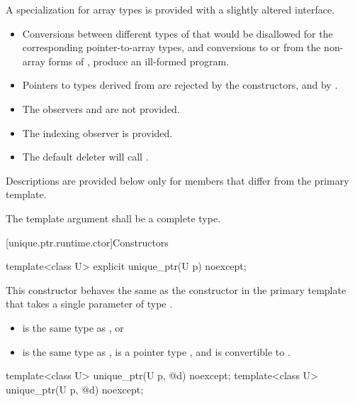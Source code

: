 \pnum
A specialization for array types is provided with a slightly altered
interface.

\begin{itemize}
\item Conversions between different types of
that would be disallowed for the corresponding pointer-to-array types,
and conversions to or from the non-array forms of
, produce an ill-formed program.

\item Pointers to types derived from  are
rejected by the constructors, and by .

\item The observers  and
 are not provided.

\item The indexing observer  is provided.

\item The default deleter will call .
\end{itemize}

\pnum
Descriptions are provided below only for members that
differ from the primary template.

\pnum
The template argument  shall be a complete type.

[unique.ptr.runtime.ctor]{Constructors}

%
\begin{itemdecl}
template<class U> explicit unique_ptr(U p) noexcept;
\end{itemdecl}

\begin{itemdescr}
\pnum
This constructor behaves the same as
the constructor in the primary template that
takes a single parameter of type .

\pnum
\constraints
\begin{itemize}
\item {} is the same type as , or
\item {} is the same type as ,
 is a pointer type , and
 is convertible to .
\end{itemize}
\end{itemdescr}

%
\begin{itemdecl}
template<class U> unique_ptr(U p, @\seebelow@ d) noexcept;
template<class U> unique_ptr(U p, @\seebelow@ d) noexcept;
\end{itemdecl}


